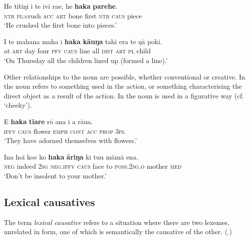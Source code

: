 \ea\label{ex:8.251}
\gll He tītiŋi i te ivi ra{\ꞌ}e, he \textbf{haka} \textbf{parehe}.\\
\textsc{ntr} \textsc{pl}:crush \textsc{acc} \textsc{art} bone first \textsc{ntr} \textsc{caus} piece\\

\glt 
‘He crushed the first bone into pieces.’ \textstyleExampleref{[Mtx-3-01.199]}
\z

\ea\label{ex:8.252}
\gll {\ꞌ}I te mahana maha i \textbf{haka} \textbf{kāuŋa} tahi era te ŋā poki. \\
at \textsc{art} day four \textsc{pfv} \textsc{caus} line all \textsc{dist} \textsc{art} \textsc{pl} child \\

\glt
‘On Thursday all the children lined up (formed a line).’ \textstyleExampleref{[R334.139]} 
\z

Other relationships to the noun are possible, whether conventional or creative. In  the noun refers to something used in the action, or something characterising the direct object as a result of the action. In  the noun is used in a figurative way (cf.  ‘cheeky’). 

\ea\label{ex:8.253}
\gll E \textbf{haka} \textbf{tiare} rō {\ꞌ}ana i a rāua. \\
\textsc{ipfv} \textsc{caus} flower \textsc{emph} \textsc{cont} \textsc{acc} \textsc{prop} \textsc{3pl} \\

\glt 
‘They have adorned themselves with flowers.’ \textstyleExampleref{[R416.415]} 
\z

\ea\label{ex:8.254}
\gll {\ꞌ}Ina ho{\ꞌ}i koe ko \textbf{haka} \textbf{{\ꞌ}āriŋa} ki tu{\ꞌ}u māmā ena.\\
\textsc{neg} indeed \textsc{2sg} \textsc{neg.ipfv} \textsc{caus} face to \textsc{poss.2sg.o} mother \textsc{med}\\

\glt 
‘Don’t be insolent to your mother.’ \textstyleExampleref{[R103.065]} 
\z

\subsection{Lexical causatives}\label{sec:8.12.7}

The term \textit{lexical causative} refers to a situation where there are two lexemes, unrelated in form, one of which is semantically the causative of the other. (\citealt[248]{Dixon2012}.) 

